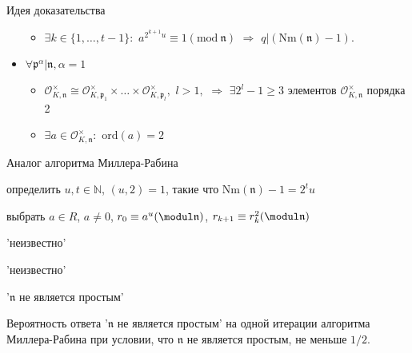 \documentclass[8pt, xcolor=x11names]{beamer}
\begin{document}
\begin{frame}
\begin{block}{Идея доказательства}
\begin{itemize}
\begin{itemize}
                \item $\exists k \in \{1,\ldots, t-1\}:$ $a^{2^{k+1}u} \equiv 1 (\textrm{mod} \ \mathfrak{n})$ $\Rightarrow$ $q|(\textrm{Nm}(\mathfrak{n})-1).$
            \end{itemize}
                
            \item $\forall \mathfrak{p}^\alpha|\mathfrak{n}, \alpha = 1$
            \begin{itemize}
                \item $\mathcal{O}_{K,\mathfrak{n}}^\times\cong \mathcal{O}_{K,\mathfrak{p}_1}^\times \times\ldots\times \mathcal{O}_{K,\mathfrak{p}_l}^\times,$ $l>1,$ $\Rightarrow$ $\exists 2^l-1\ge 3$ элементов $\mathcal{O}_{K,\mathfrak{n}}^\times$ порядка 2 
                
                \item $\exists a \in \mathcal{O}_{K,\mathfrak{n}}^\times:$ $\textrm{ord}(a)=2$
            \end{itemize}
        \end{itemize}
    \end{block}
\end{frame}

\begin{frame}
    \begin{block}{Аналог алгоритма Миллера-Рабина}
        \begin{algorithmic}[1]
            \State определить $u, t \in \mathbb{N}$, $(u,2) = 1$, такие что $\textrm{Nm}(\mathfrak{n})-1 = 2^tu$
    
            \State выбрать $a \in R$, $a \neq 0$, $r_0\equiv a^u (\modul \mathfrak{n})$, $r_{k + 1} \equiv r_k^2(\modul \mathfrak{n})$
            
                \State\Return 'неизвестно'
            \EndIf

                    \State\Return 'неизвестно'
                \EndIf
            \EndFor
            
            \State\Return '$\mathfrak{n}$ не является простым'
        \end{algorithmic}
    \end{block}
    
    \begin{block_notitle}{}
        Вероятность ответа '$\mathfrak{n}$ не является простым' на одной итерации алгоритма Миллера-Рабина при условии, что $\mathfrak{n}$ не является простым, не меньше $1/2$.
    \end{block_notitle}
\end{frame}
\end{document}
